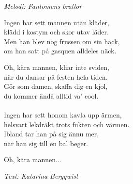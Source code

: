 {\footnotesize\textit{Melodi: Fantomens brallor}}\par
\vspace{10pt}
Ingen har sett mannen utan kläder,\\
klädd i kostym och skor utav läder.\\
Men han blev nog frussen om sin häck,\\
om han satt på gasquen alldeles näck.\par
\vspace{10pt}
Oh, kära mannen, kliar inte sviden,\\
när du dansar på festen hela tiden.\\
Gör som damen, skaffa dig en kjol,\\
du kommer ändå alltid va' cool.\\
\\
Ingen har sett honom kavla upp ärmen,\\
helsvart lekdräkt trots fukten och värmen.\\
Ibland tar han på sig ännu mer,\\
när han sig till en bal beger.\par
\vspace{10pt}
Oh, kära mannen...
\par
\vspace{10pt}
{\footnotesize\textit{Text: Katarina Bergqwist}}
